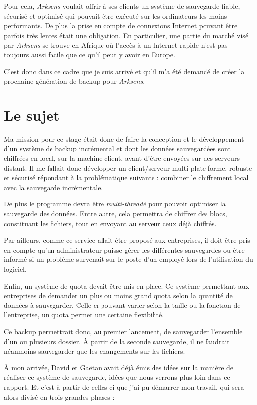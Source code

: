 \documentclass[a4paper,10pt, twoside]{report}
\begin{document}
\begin{spacing}{1.2}
Pour cela, \textit{Arksens} voulait offrir à ses clients un système de
sauvegarde fiable, sécurisé et optimisé qui pouvait être
exécuté sur les ordinateurs les moins performants. De plus la prise en
compte de connexions Internet pouvant être parfois très lentes était une
obligation. En particulier, une partie du marché visé par \textit{Arksens}
se trouve en Afrique où l'accès à un Internet rapide n'est pas toujours
aussi facile que ce qu'il peut y avoir en Europe.

C'est donc dans ce cadre que je suis arrivé et qu'il m'a été demandé
de créer la prochaine génération de backup pour \textit{Arksens}.

\section{Le sujet}

Ma mission pour ce stage était donc de faire la conception et le
développement d'un système de backup incrémental et dont les données
sauvegardées sont chiffrées en local, sur la machine client, avant d'être
envoyées sur des serveurs distant. Il me fallait donc développer un
client/serveur multi-plate-forme, robuste et sécurisé répondant à
la problématique suivante : combiner le chiffrement local avec la sauvegarde
incrémentale.

De plus le programme devra être \textit{multi-threadé} pour pouvoir
optimiser la sauvegarde des données. Entre autre, cela permettra de chiffrer
des blocs, constituant les fichiers, tout en envoyant au serveur ceux déjà
chiffrés.

Par ailleurs, comme ce service allait être proposé aux entreprises, il doit être
pris en compte qu'un administrateur puisse gérer les différentes
sauvegardes ou être informé si un problème survenait sur le poste d'un
employé lors de l'utilisation du logiciel.

Enfin, un système de quota devait être mis en place. Ce système permettant
aux entreprises de demander un plus ou moins grand quota selon la quantité de
données à sauvegarder. Celle-ci pouvant varier selon la taille ou la
fonction de l'entreprise, un quota permet une certaine flexibilité.

Ce backup permettrait donc, au premier lancement, de sauvegarder l'ensemble
d'un ou plusieurs dossier. À partir de la seconde sauvegarde, il ne faudrait
néanmoins sauvegarder que les changements sur les fichiers.

À mon arrivée, David et Gaëtan avait déjà émis des idées sur la
manière de réaliser ce système de sauvegarde, idées que nous verrons
plus loin dans ce rapport. Et c'est à partir de celles-ci que j'ai pu
démarrer mon travail, qui sera alors divisé en trois grandes phases :


\end{spacing}
\end{document}

